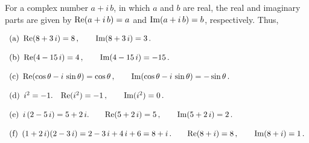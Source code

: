 For a complex number $a+i\,b$, in which $a$ and $b$ are real, the real and imaginary parts
are given by ${\rm Re}(a+i\,b)=a$ and ${\rm Im}(a+i\,b)=b$, respectively.  Thus,

$
\begin{array}[h!]{l}
{\rm (a)}\hskip5pt {\rm Re}(8+3\,i)=8\, ,\qquad{\rm Im}(8+3\,i)=3\, .\\
\noalign{\vskip12pt}
{\rm (b)}\hskip5pt {\rm Re}(4-15\,i)=4\, ,\qquad {\rm Im}(4-15\,i)=-15\, .\\
\noalign{\vskip12pt}
{\rm (c)}\hskip5pt {\rm Re}(\cos\theta-i\,\sin\theta)=\cos\theta\, ,\qquad {\rm
Im}(\cos\theta-i\,\sin\theta)=-\sin\theta\, .\\
\noalign{\vskip12pt}
{\rm (d)}\hskip5pt i^2=-1.\quad  {\rm Re}(i^2)=-1\, ,\qquad {\rm Im}(i^2)=0\, .\\
\noalign{\vskip12pt}
{\rm (e)}\hskip5pt i\,(2-5\,i)=5+2\,i.\qquad  {\rm Re}(5+2\,i)=5\, ,\qquad {\rm Im}(5+2\,i)=2\, .\\
\noalign{\vskip12pt}
{\rm (f)}\hskip5pt (1+2\,i)(2-3\,i)=2-3\,i+4\,i+6=8+i\, .\qquad {\rm Re}(8+i)=8\, ,\qquad {\rm
Im}(8+i)=1\, .
\end{array}
$
